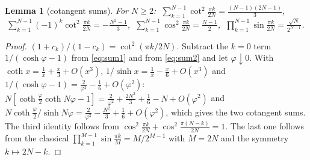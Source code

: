 \documentclass[11pt,a4paper]{article}
\theoremstyle{plain}
\newtheorem{lemma}[theorem]{Lemma}
\theoremstyle{definition}
\numberwithin{equation}{section}
\begin{document}
\begin{lemma}[cotangent sums]\label{lem:cot}
For $N\ge2$: $\ \displaystyle\sum_{k=1}^{N-1}\cot^2\frac{\pi k}{2N}=\frac{(N-1)(2N-1)}{3}$, $\ \displaystyle\sum_{k=1}^{N-1}(-1)^k\cot^2\frac{\pi k}{2N}=-\frac{N^2-1}{3}$, $\ \displaystyle\sum_{k=1}^{N-1}\cos^2\frac{\pi k}{2N}=\frac{N-1}2$, $\ \displaystyle\prod_{k=1}^{N-1}\sin\frac{\pi k}{2N}=\frac{\sqrt N}{2^{N-1}}$.
\end{lemma}
\begin{proof}
$(1+c_k)/(1-c_k)=\cot^2(\pi k/2N)$. Subtract the $k=0$ term $1/(\cosh\varphi-1)$ from \eqref{eq:sum1} and from \eqref{eq:sum2} and let $\varphi\downarrow0$. With $\coth x=\frac1x+\frac x3+O(x^3)$, $1/\sinh x=\frac1x-\frac x6+O(x^3)$ and $1/(\cosh\varphi-1)=\frac{2}{\varphi^2}-\frac16+O(\varphi^2)$:
$N[\coth\frac\varphi2\coth N\varphi-1]=\frac2{\varphi^2}+\frac{2N^2}3+\frac16-N+O(\varphi^2)$ and $N\coth\frac\varphi2/\sinh N\varphi=\frac{2}{\varphi^2}-\frac{N^2}{3}+\frac16+O(\varphi^2)$, which gives the two cotangent sums. The third identity follows from $\cos^2\frac{\pi k}{2N}+\cos^2\frac{\pi(N-k)}{2N}=1$. The last one follows from the classical $\prod_{k=1}^{M-1}\sin\frac{\pi k}{M}=M/2^{M-1}$ with $M=2N$ and the symmetry $k\mapsto2N-k$.
\end{proof}
\end{document}
